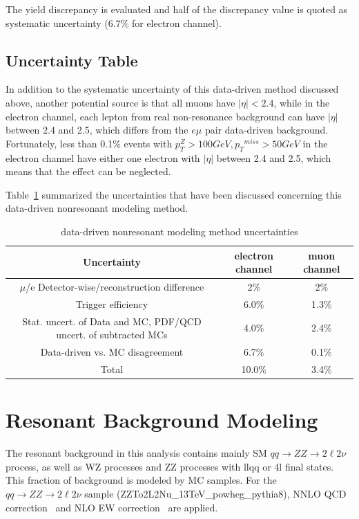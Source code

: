\vspace{0.3cm}
The yield discrepancy is evaluated and half of the discrepancy value is quoted as systematic uncertainty (6.7\% for electron channel).

\subsection{Uncertainty Table}
In addition to the systematic uncertainty of this data-driven method discussed above, another potential source is that all muons have $|\eta|<2.4$, while in the electron channel, each lepton from real non-resonance background can have $|\eta|$ between 2.4 and 2.5, which differs from the $e\mu$ pair data-driven background. Fortunately, less than 0.1\% events with $p_{T}^{Z}>100GeV, {p_{T}}^{miss}>50GeV$ in the electron channel have either one electron with $|\eta|$ between 2.4 and 2.5, which means that the effect can be neglected. 

\vspace{0.3cm}
Table~\ref{tab:nonresuncert} summarized the uncertainties that have been discussed concerning this data-driven nonresonant modeling method.
\begin{table}[htbp]
\begin{small}
  \begin{center}
    \caption{
      data-driven nonresonant modeling method uncertainties
      \label{tab:nonresuncert}}
    \begin{tabular}{c|c c}
      \hline\hline
      Uncertainty & electron channel & muon channel \\
      \hline
      $\mu$/e Detector-wise/reconstruction difference & 2\% & 2\% \\
      Trigger efficiency & 6.0\% & 1.3\% \\
      Stat. uncert. of Data and MC, PDF/QCD uncert. of subtracted MCs  & 4.0\% & 2.4\% \\
      Data-driven vs. MC disagreement & 6.7\% & 0.1\% \\
      \hline
      Total  & 10.0\% & 3.4\% \\
      \hline\hline
    \end{tabular}
  \end{center}
\end{small}
\end{table}

\clearpage
\section{Resonant Background Modeling}
The resonant background in this analysis contains mainly SM $qq\rightarrow ZZ\rightarrow 2\ell 2\nu$ process, as well as WZ processes and ZZ processes with llqq or 4l final states. This fraction of background is modeled by MC samples. For the $qq\rightarrow ZZ\rightarrow 2\ell 2\nu$ sample (ZZTo2L2Nu\_13TeV\_powheg\_pythia8), NNLO QCD correction~\cite{bg_nnloqcd} and NLO EW correction~\cite{bg_nloqed1,bg_nloqed2} are applied.

